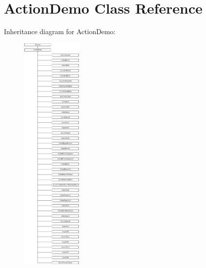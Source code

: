 \hypertarget{interface_action_demo}{\section{Action\-Demo Class Reference}
\label{interface_action_demo}
}
Inheritance diagram for Action\-Demo\-:\begin{figure}[H]
\begin{center}
\leavevmode
\includegraphics[height=12.000000cm]{interface_action_demo}
\end{center}
\end{figure}
